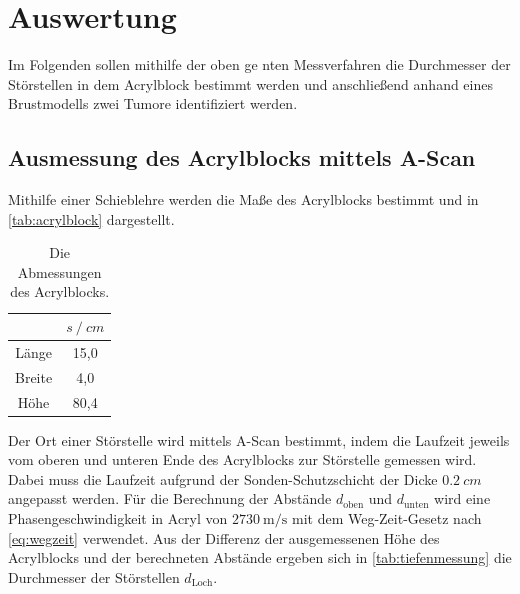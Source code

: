\section{Auswertung}
\label{sec:Auswertung}

Im Folgenden sollen mithilfe der oben ge   nten Messverfahren die Durchmesser der Störstellen in dem Acrylblock bestimmt werden
und anschließend anhand eines Brustmodells zwei Tumore identifiziert werden.


\subsection{Ausmessung des Acrylblocks mittels A-Scan} \label{sec:a-scan}

Mithilfe einer Schieblehre werden die Maße des Acrylblocks bestimmt und in \autoref{tab:acrylblock} dargestellt.
\begin{table}
  \centering
  \caption{Die Abmessungen des Acrylblocks.}
  \label{tab:acrylblock}
  \begin{tabular}{c c}
    \toprule
    & $s \mathbin{/} \unit{cm}$ \\
    \midrule
    Länge   & 15,0 \\
    Breite  &  4,0 \\
    Höhe    & 80,4 \\
    \bottomrule
  \end{tabular}
\end{table}

Der Ort einer Störstelle wird mittels A-Scan bestimmt, indem die Laufzeit jeweils vom oberen und unteren Ende des Acrylblocks zur Störstelle gemessen wird.
Dabei muss die Laufzeit aufgrund der Sonden-Schutzschicht der Dicke $\qty{0.2}{cm}$ angepasst werden.
Für die Berechnung der Abstände $d_\text{oben}$ und $d_\text{unten}$ wird eine Phasengeschwindigkeit in Acryl
von $\qty{2730}{\meter\per\second}$ \cite{schallgeschw} mit dem Weg-Zeit-Gesetz nach \autoref{eq:wegzeit} verwendet.
Aus der Differenz der ausgemessenen Höhe des Acrylblocks und der berechneten Abstände ergeben sich in \autoref{tab:tiefenmessung} die Durchmesser der Störstellen $d_\text{Loch}$.

